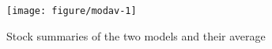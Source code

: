 \documentclass[a4paper,english,10pt]{article}\usepackage[]{graphicx}\usepackage[]{color}
\makeatletter
\def\maxwidth{ %
  \ifdim\Gin@nat@width>\linewidth
    \linewidth
  \else
    \Gin@nat@width
  \fi
}
\newenvironment{knitrout}{}{} %
\makeatother
\begin{document}
\begin{knitrout}
\color{fgcolor}\begin{figure}[H]

{\centering \texttt{[image: figure/modav-1]} 

}

\caption[Stock summaries of the two models and their average]{Stock summaries of the two models and their average}\label{fig:modav}
\end{figure}


\end{knitrout}
\end{document}
